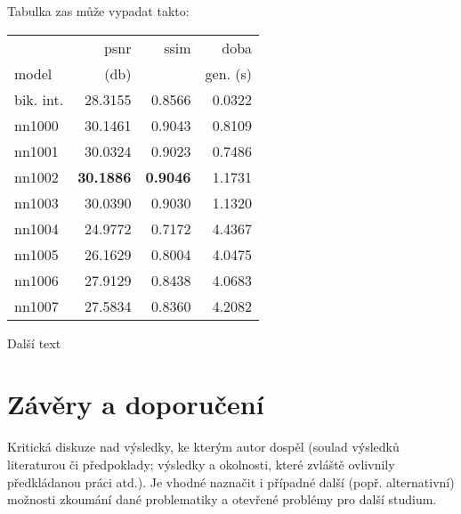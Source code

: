 			Tabulka zas může vypadat takto:

			\begin{table}[hbt!]
				\centering
				\begin{tabular}{| l | r | r | r | }
					\hline
					&        psnr &      ssim &      doba  \\
					model &       (db)    &           & gen. (s) \\
					\hline
					bik. int. & 28.3155 & 0.8566 & 0.0322 \\
					nn1000    & 30.1461 & 0.9043 & 0.8109 \\
					nn1001    & 30.0324 & 0.9023 & 0.7486 \\
					nn1002    & \textbf{30.1886} & \textbf{0.9046} & 1.1731 \\
					nn1003    & 30.0390 & 0.9030 & 1.1320 \\
					nn1004    & 24.9772 & 0.7172 & 4.4367 \\
					nn1005    & 26.1629 & 0.8004 & 4.0475 \\
					nn1006    & 27.9129 & 0.8438 & 4.0683 \\
					nn1007    & 27.5834 & 0.8360 & 4.2082 \\
					\hline
				\end{tabular}
			\end{table}

			\newpage

			Další text

\section{Závěry a doporučení}


Kritická diskuze nad výsledky, ke kterým autor dospěl (soulad výsledků  literaturou či předpoklady;
výsledky a okolnosti, které zvláště ovlivnily předkládanou práci atd.). Je vhodné naznačit i případné další
(popř. alternativní) možnosti zkoumání dané problematiky a otevřené problémy pro další studium.
